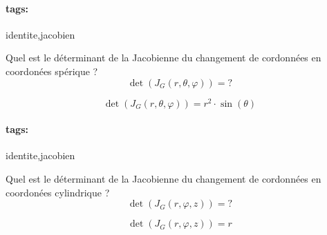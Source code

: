 \documentclass[12pt]{article}
\newcommand*{\xfield}[1]{\begin{mdframed}\centering #1\end{mdframed}\bigskip}
\newenvironment{note}{}{}
\newcommand*{\tags}[1]{\paragraph{tags: }#1}
\begin{document}
\begin{note}
	\tags{identite,jacobien}
	\xfield{Quel est le déterminant de la Jacobienne du changement de cordonnées en coordonées spérique ?\\
	$$\det(J_G(r,\theta,\varphi)) = ?$$}
	\xfield{$$\det(J_G(r,\theta,\varphi)) = r^2 \cdot \sin(\theta)$$}
\end{note}
\begin{note}
	\tags{identite,jacobien}
	\xfield{Quel est le déterminant de la Jacobienne du changement de cordonnées en coordonées cylindrique ?\\
	$$\det(J_G(r,\varphi,z)) = ?$$}
	\xfield{$$\det(J_G(r,\varphi,z)) = r$$}
\end{note}
\end{document}

